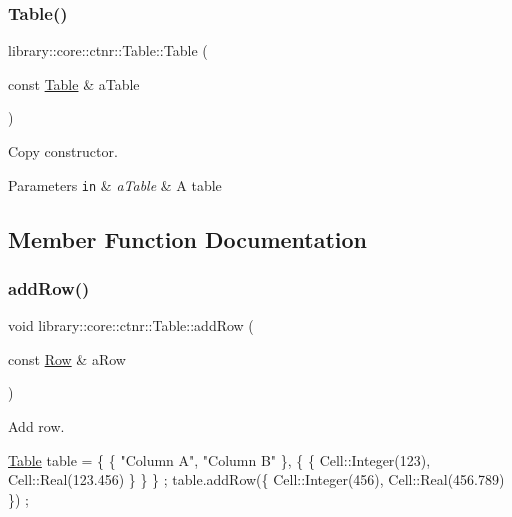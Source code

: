\subsubsection{\texorpdfstring{Table()}{Table()}\hspace{0.1cm}{\footnotesize\ttfamily [3/3]}}
{\footnotesize\ttfamily library\+::core\+::ctnr\+::\+Table\+::\+Table (\begin{DoxyParamCaption}\item[{const \hyperlink{classlibrary_1_1core_1_1ctnr_1_1_table}{Table} \&}]{a\+Table }\end{DoxyParamCaption})}



Copy constructor. 


\begin{DoxyParams}[1]{Parameters}
\mbox{\tt in}  & {\em a\+Table} & A table \\
\hline
\end{DoxyParams}


\subsection{Member Function Documentation}
\mbox{\label{classlibrary_1_1core_1_1ctnr_1_1_table_a9c9b8b7a2eca260d58b721c4f465a7d3}} 
\subsubsection{\texorpdfstring{add\+Row()}{addRow()}}
{\footnotesize\ttfamily void library\+::core\+::ctnr\+::\+Table\+::add\+Row (\begin{DoxyParamCaption}\item[{const \hyperlink{classlibrary_1_1core_1_1ctnr_1_1table_1_1_row}{Row} \&}]{a\+Row }\end{DoxyParamCaption})}



Add row. 


\begin{DoxyCode}
\hyperlink{classlibrary_1_1core_1_1ctnr_1_1_table_a5b11121caa4288c3da642af7c6a5a632}{Table} table = \{ \{ \textcolor{stringliteral}{"Column A"}, \textcolor{stringliteral}{"Column B"} \}, \{ \{ Cell::Integer(123), Cell::Real(123.456) \} \} \} ;
table.addRow(\{ Cell::Integer(456), Cell::Real(456.789) \}) ;
\end{DoxyCode}



